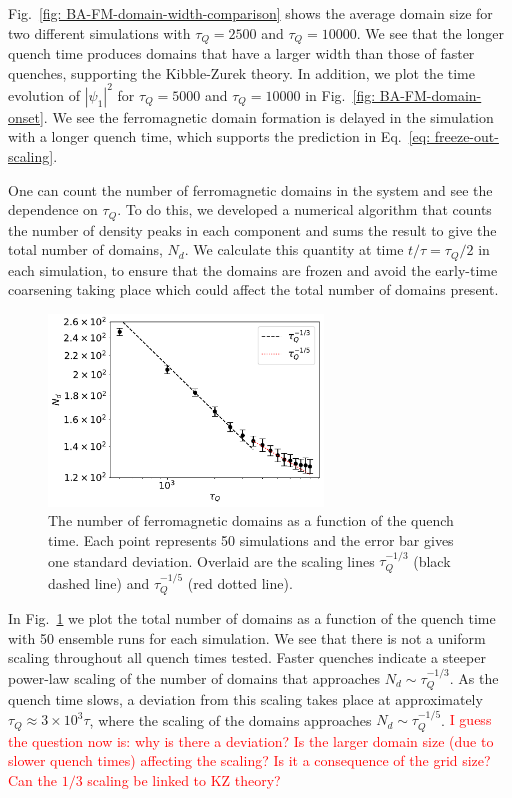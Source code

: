 Fig.~\ref{fig: BA-FM-domain-width-comparison} shows the average domain size
for two different simulations with $\tau_Q=2500$ and $\tau_Q=10000$.
We see that the longer quench time produces domains that have a
larger width than those of faster quenches, supporting the Kibble-Zurek theory.
In addition, we plot the time evolution of $|\psi_1|^2$ for $\tau_Q=5000$ and
$\tau_Q=10000$ in Fig.~\ref{fig: BA-FM-domain-onset}.
We see the ferromagnetic domain formation is delayed in the simulation
with a longer quench time, which supports the prediction in
Eq.~\eqref{eq: freeze-out-scaling}.

One can count the number of ferromagnetic domains in the system and see the
dependence on $\tau_Q$.
To do this, we developed a numerical algorithm that counts the number of
density peaks in each component and sums the result to give the total number of
domains, $N_d$.
We calculate this quantity at time $t/\tau=\tau_Q/2$ in each simulation, to
ensure that the domains are frozen and avoid the early-time coarsening
taking place which could affect the total number of domains present.
\begin{figure}
    \centering
    \includegraphics[width=0.65\textwidth]{gfx/ch-spin1/FM_domains_scaling.pdf}
    \caption{The number of ferromagnetic domains as a function of the
    quench time. Each point represents 50 simulations and the
    error bar gives one standard deviation. Overlaid are the scaling lines
    $\tau_Q^{-1/3}$ (black dashed line) and $\tau_Q^{-1/5}$ (red dotted line).}
    \label{fig: FM-domains-scaling}
\end{figure}
In Fig.~\ref{fig: FM-domains-scaling} we plot the total number of domains
as a function of the quench time with 50 ensemble runs for each simulation.
We see that there is not a uniform scaling throughout all quench times tested.
Faster quenches indicate a steeper power-law scaling of the number of domains
that approaches $N_d\sim\tau_Q^{-1/3}$.
As the quench time slows, a deviation from this scaling takes place at
approximately $\tau_Q\approx 3\times10^3\tau$, where the scaling of the domains
approaches $N_d\sim\tau_Q^{-1/5}$.
\textcolor{red}{I guess the question now is: why is there a deviation?
Is the larger domain size (due to slower quench times) affecting the scaling?
Is it a consequence of the grid size? Can the $1/3$ scaling be linked to KZ
theory?}


